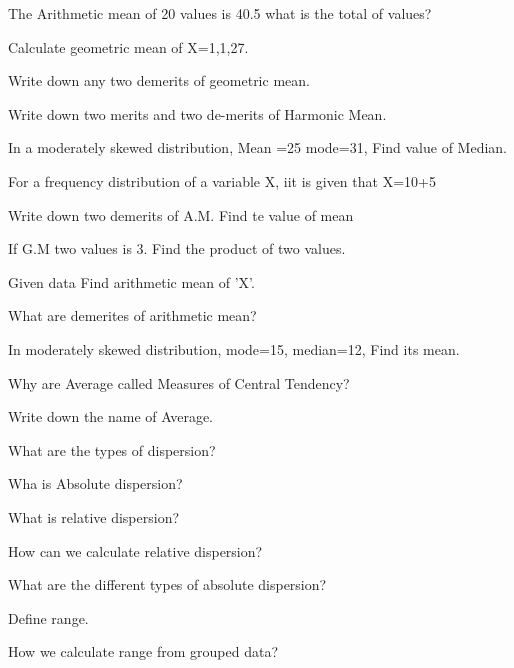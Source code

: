 \documentclass[11pt,a4paper]{article}
\begin{document}
\begin{shortlist}
\item The Arithmetic mean of 20 values is 40.5 what is the total of values?

\item Calculate geometric mean of X=1,1,27.

\item Write down any two demerits of geometric mean.

\item Write down two merits and two de-merits of Harmonic Mean.

\item In a moderately skewed distribution, Mean =25 mode=31, Find value of Median.

\item For a frequency distribution of a variable X, iit is given that X=10+5

\item Write down two demerits of A.M. Find te value of mean

\item If G.M two values is 3. Find the product of two values.

\item Given data Find arithmetic mean of 'X'.

\item What are demerites of arithmetic mean?

\item In moderately skewed distribution, mode=15, median=12, Find its mean.

\item Why are Average called Measures of Central Tendency?

\item Write down the name of Average.

\item What are the types of dispersion?

\item Wha is Absolute dispersion?

\item What is relative dispersion?

\item How can we calculate relative dispersion?

\item What are the different types of absolute dispersion?

\item Define range.

\item How we calculate range from grouped data?


\end{shortlist}
\end{document}
